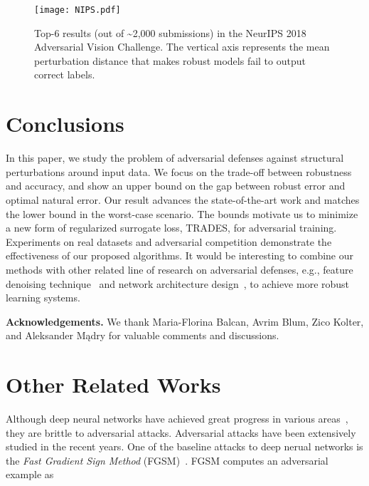 \documentclass[11pt]{article}
\newcommand{\0}{\mathbf{0}}
\newcommand{\1}{\mathbf{1}}
\begin{document}
\begin{figure}
\centering
\texttt{[image: NIPS.pdf]}
\caption{Top-6 results (out of \textasciitilde2,000 submissions) in the NeurIPS 2018 Adversarial Vision Challenge. The vertical axis represents the mean  perturbation distance that makes robust models fail to output correct labels.}
\label{figure: NIPS competition}
\end{figure}

\section{Conclusions}

In this paper, we study the problem of adversarial defenses against structural perturbations around input data. We focus on the trade-off between robustness and accuracy, and show an upper bound on the gap between robust error and optimal natural error. Our
result advances the state-of-the-art work and matches the lower bound in the worst-case scenario. The bounds motivate us to minimize a new form of regularized surrogate loss, TRADES, for adversarial training. Experiments on real datasets and adversarial competition demonstrate the effectiveness of our proposed algorithms.
It would be interesting to combine our methods with other related line of research on adversarial defenses, e.g., feature denoising technique~\cite{xie2018feature} and network architecture design~\cite{cisse2017parseval}, to achieve more robust learning systems.

\medskip
\noindent\textbf{Acknowledgements.} We thank Maria-Florina Balcan, Avrim Blum, Zico Kolter, and Aleksander Mądry for valuable comments and discussions.




\newpage
\onecolumn
\appendix


\section{Other Related Works}

\medskip
{} Although deep neural networks have achieved great progress in various areas~\cite{zhang2019deep,zhang2018stackelberg}, they are brittle to adversarial attacks. Adversarial attacks have been extensively studied in the recent
years. One of the baseline attacks to deep nerual networks is the \emph{Fast Gradient Sign Method} (FGSM)~\cite{goodfellow6572explaining}. FGSM computes an adversarial example as
\end{document}
